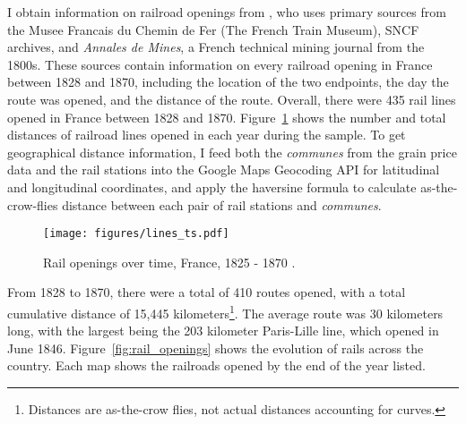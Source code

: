 \documentclass[12pt,twoside]{article}
\begin{document}
I obtain information on railroad openings from \cite{palau2,palau3,palau4}, who uses primary sources from the Musee Francais du Chemin de Fer (The French Train Museum), SNCF archives, and \emph{Annales de Mines}, a French technical mining journal from the 1800s.
These sources contain information on every railroad opening in France between 1828 and 1870, including the location of the two endpoints, the day the route was opened, and the distance of the route.
Overall, there were 435 rail lines opened in France between 1828 and 1870.
Figure~\ref{fig:lines_year} shows the number and total distances of railroad lines opened in each year during the sample.
To get geographical distance information, I feed both the \emph{communes} from the grain price data and the rail stations into the Google Maps Geocoding API \citep{google} for latitudinal and longitudinal coordinates, and apply the haversine formula to calculate as-the-crow-flies distance between each pair of rail stations and \emph{communes}.

\begin{figure}[h]
	\centering
	\caption{Rail openings over time, France, 1825 - 1870 \citep{prices}.}
	\texttt{[image: figures/lines\_ts.pdf]}
	\label{fig:lines_year}
\end{figure}

From 1828 to 1870, there were a total of 410 routes opened, with a total cumulative distance of 15,445 kilometers\footnote{Distances are as-the-crow flies, not actual distances accounting for curves.}.
The average route was 30 kilometers long, with the largest being the 203 kilometer Paris-Lille line, which opened in June 1846.
Figure~\ref{fig:rail_openings} shows the evolution of rails across the country.
Each map shows the railroads opened by the end of the year listed.
\end{document}
